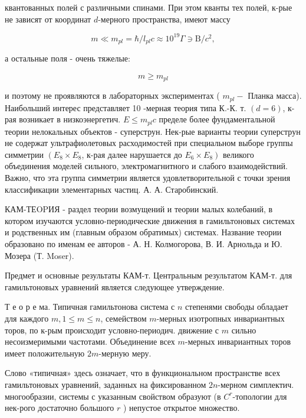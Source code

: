 \documentclass[10pt]{article}
\begin{document}
квантованных полей с различными спинами. При этом кванты тех полей, к-рые не зависят от координат $d$-мерного пространства, имеют массу



\[

m \ll m_{p l}=\hbar / l_{p l} c \approx 10^{19} \Gamma \ni \mathrm{B} / c^{2},

\]



а остальные поля - очень тяжелые:



\[

m \geqslant m_{p l}

\]



и поэтому не проявляются в лабораторных экспериментах ( $m_{p l}-$ Планка масса). Наибольший интерес представляет 10 -мерная теория типа К.-К. т. $(d=6)$, к-рая возникает в низкоэнергетич. $E \leqslant m_{p l} c$ пределе более фундаментальной теории нелокальных объектов - суперструн. Нек-рые варианты теории суперструн не содержат ультрафиолетовых расходимостей при специальном выборе группы симметрии $\left(E_{8} \times E_{8}\right.$, к-рая далее нарушается до $\left.E_{6} \times E_{8}\right)$ великого объединения моделей сильного, электромагнитного и слабого взаимодействий. Важно, что эта группа симметрии является удовлетворительной с точки зрения классификации элементарных частиц. А. А. Старобинский.



КАМ-ТЕOPИЯ - раздел теории возмущений и теории малых колебаний, в котором изучаются условно-периодические движения в гамильтоновых системах и родственных им (главным образом обратимых) системах. Название теории образовано по именам ее авторов - А. Н. Колмогорова, В. И. Арнольда и Ю. Мозера (Т. Moser).



Предмет и основные результаты КАМ-т. Центральным результатом КАМ-т. для гамильтоновых уравнений является следующее утверждение.



Т е о р е ма. Типичная гамильтонова система с $n$ степенями свободы обладает для каждого $m, 1 \leqslant m \leqslant n$, семейством $m$-мерных изотропных инвариантных торов, по к-рым происходит условно-периодич. движение с $m$ сильно несоизмеримыми частотами. Объединение всех $m$-мерных инвариантных торов имеет положительную $2 m$-мерную меру.



Слово «типичная» здесь означает, что в функциональном пространстве всех гамильтоновых уравнений, заданных на фиксированном $2 n$-мерном симплектич. многообразии, системы с указанным свойством образуют (в $C^{r}$-топологии для нек-рого достаточно большого $r$ ) непустое открытое множество.
\end{document}

